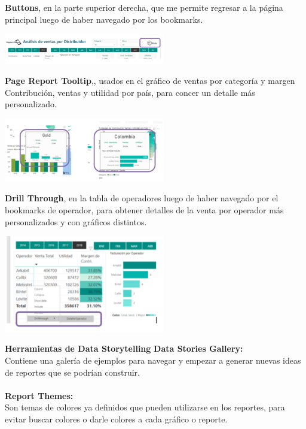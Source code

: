 \documentclass[twoside,twocolumn]{article}
\begin{document}
\textbf{Buttons}, en la parte superior derecha, que me permite regresar a la página principal luego de haber navegado por los bookmarks.
\begin{center}
	\includegraphics[width=7cm]{./imagenes/i4.png} 
\end{center}

\textbf{Page Report Tooltip},, usados en el gráfico de ventas por categoría y margen Contribución, ventas y utilidad por país, para concer un detalle más personalizado.
\begin{center}
	\includegraphics[width=7cm]{./imagenes/i5.png} 
\end{center}

\textbf{Drill Through}, en la tabla de operadores luego de haber navegado por el bookmarks de operador, para obtener detalles de la venta por operador más personalizados y con gráficos distintos.
\begin{center}
	\includegraphics[width=7cm]{./imagenes/i6.png} 
\end{center}

\textbf{Herramientas de Data Storytelling}
\textbf{Data Stories Gallery:} 
\\Contiene una galería de ejemplos para navegar y
 empezar a generar nuevas ideas de reportes que se 
 podrían construir.\\\\

\textbf{Report Themes:} 
\\Son temas de colores ya definidos que pueden utilizarse 
en los reportes, para evitar buscar colores o darle colores 
a cada gráfico o reporte.\\\\
\end{document}
